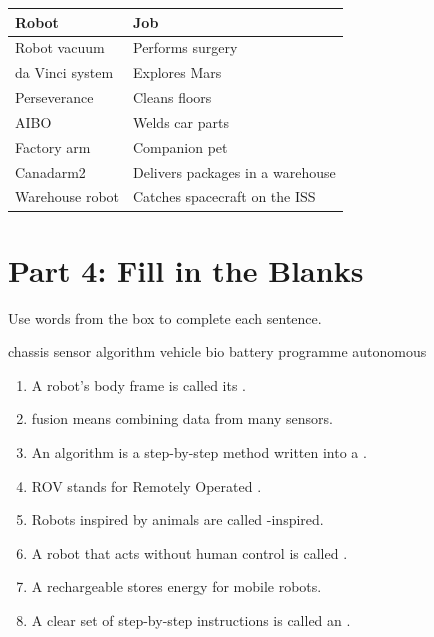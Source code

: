 \begin{center}
\begin{tabularx}{0.85\textwidth}{|X|X|}
  \hline
  \textbf{Robot} & \textbf{Job} \\
  \hline
  Robot vacuum & Performs surgery \\
  \hline
  da Vinci system & Explores Mars \\
  \hline
  Perseverance & Cleans floors \\
  \hline
  AIBO & Welds car parts \\
  \hline
  Factory arm & Companion pet \\
  \hline
  Canadarm2 & Delivers packages in a warehouse \\
  \hline
  Warehouse robot & Catches spacecraft on the ISS \\
  \hline
\end{tabularx}
\end{center}

\sectionrule

\section*{Part 4: Fill in the Blanks}

Use words from the box to complete each sentence.

\begin{center}
\begin{tcolorbox}[colback=LightGray,colframe=RoboGreen!40,arc=4pt,boxrule=0.6pt,
  left=8pt,right=8pt,top=6pt,bottom=6pt]
  \centering
  chassis \quad sensor \quad algorithm \quad vehicle \quad bio \quad battery \quad programme \quad autonomous
\end{tcolorbox}
\end{center}

\begin{enumerate}
  \item A robot's body frame is called its \underline{\hspace{3cm}}.
  \item \underline{\hspace{3cm}} fusion means combining data from many sensors.
  \item An algorithm is a step-by-step method written into a \underline{\hspace{3cm}}.
  \item ROV stands for Remotely Operated \underline{\hspace{3cm}}.
  \item Robots inspired by animals are called \underline{\hspace{3cm}}-inspired.
  \item A robot that acts without human control is called \underline{\hspace{3cm}}.
  \item A rechargeable \underline{\hspace{3cm}} stores energy for mobile robots.
  \item A clear set of step-by-step instructions is called an \underline{\hspace{3cm}}.
\end{enumerate}

